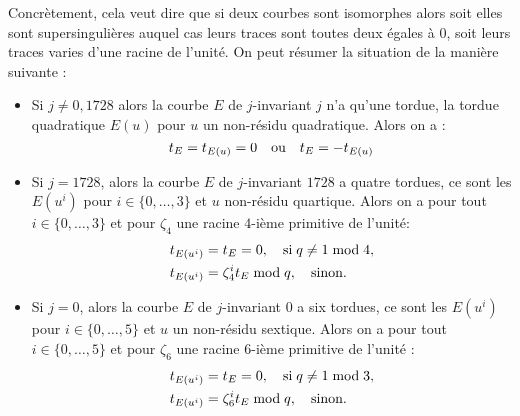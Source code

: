 \documentclass[a4paper]{article} %
\numberwithin{section}{part}
\numberwithin{equation}{section}
\newcommand\nroot[1]{\textit{#1}-ième}
\begin{document}
Concrètement, cela veut dire que si deux courbes sont isomorphes alors soit 
elles sont supersingulières auquel cas leurs traces sont toutes deux égales à 
$0$, soit leurs traces varies d'une racine de l'unité. On peut résumer la
situation de la manière suivante :
\vspace{0.3cm}
\begin{itemize}
    \item Si $j\neq0, 1728$ alors la courbe $E$ de $j$-invariant $j$ n'a qu'une 
    tordue, la tordue quadratique $E(u)$ pour $u$ un non-résidu quadratique. 
    Alors on a :
    \begin{equation}
    t_E = t_{E(u)} = 0\quad\textup{ou}\quad t_E = -t_{E(u)}
    \end{equation}

    \item Si $j = 1728$, alors la courbe $E$ de $j$-invariant $1728$ a quatre
    tordues, ce sont les $E(u^i)$ pour $i\in\lbrace{0,\dots,3}\rbrace$ et $u$
    non-résidu quartique. Alors on a pour tout $i\in\lbrace{0,\dots,3}\rbrace$ 
    et pour $\zeta_4$ une racine \nroot{$4$} primitive de l'unité:
        \begin{align}
        t_{E(u^i)} &= t_E = 0,\quad\textup{si\;}q\neq1\bmod4,\\
        t_{E(u^i)} &= \zeta_4^it_E\bmod q,\quad\textup{sinon.}
        \end{align}

    \item Si $j = 0$, alors la courbe $E$ de $j$-invariant $0$ a six tordues, ce
    sont les $E(u^i)$ pour $i\in\lbrace{0,\dots,5}\rbrace$ et $u$ un non-résidu
    sextique. Alors on a pour tout $i\in\lbrace{0,\dots,5}\rbrace$ et pour
    $\zeta_6$ une racine \nroot{$6$} primitive de l'unité :
        \begin{align}
        t_{E(u^i)} &= t_E = 0,\quad\textup{si\;}q\neq1\bmod3,\\
        t_{E(u^i)} &= \zeta_6^it_E\bmod q,\quad\textup{sinon.}
        \end{align}

\end{itemize}
\vspace{0.3cm}
\end{document}
